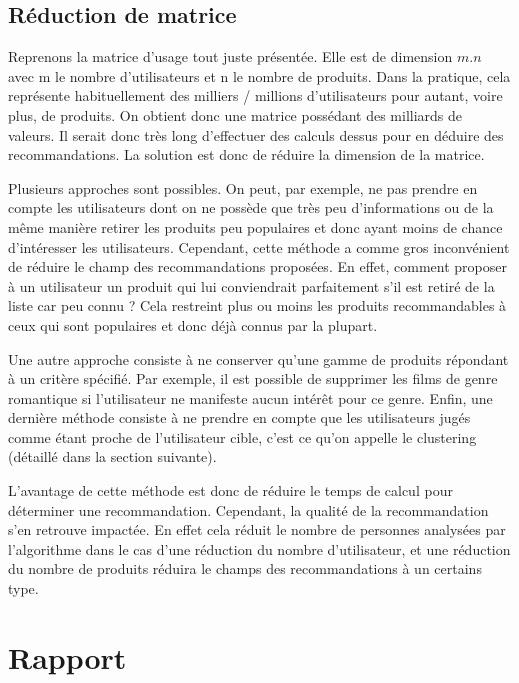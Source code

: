 \documentclass[11pt,a4paper]{report}
\begin{document}
\section{Réduction de matrice}

Reprenons la matrice d'usage tout juste présentée. Elle est de dimension $m.n$ avec m le nombre d'utilisateurs et n le nombre de produits. Dans la pratique, cela représente habituellement des milliers / millions d'utilisateurs pour autant, voire plus, de produits. On obtient donc une matrice possédant des milliards de valeurs. Il serait donc très long d'effectuer des calculs dessus pour en déduire des recommandations. La solution est donc de réduire la dimension de la matrice.
\vspace{0.5cm}

Plusieurs approches sont possibles. On peut, par exemple, ne pas prendre en compte les utilisateurs dont on ne possède que très peu d'informations ou de la même manière retirer les produits peu populaires et donc ayant moins de chance d'intéresser les utilisateurs. Cependant, cette méthode a comme gros inconvénient de réduire le champ des recommandations proposées. En effet, comment proposer à un utilisateur un produit qui lui conviendrait parfaitement s'il est retiré de la liste car peu connu ? Cela restreint plus ou moins les produits recommandables à ceux qui sont populaires et donc déjà connus par la plupart.\par
Une autre approche consiste à ne conserver qu'une gamme de produits répondant à un critère spécifié. Par exemple, il est possible de supprimer les films de genre romantique si l'utilisateur ne manifeste aucun intérêt pour ce genre. Enfin, une dernière méthode consiste à ne prendre en compte que les utilisateurs jugés comme étant proche de l'utilisateur cible, c'est ce qu'on appelle le clustering (détaillé dans la section suivante).\par
L'avantage de cette méthode est donc de réduire le temps de calcul pour déterminer une recommandation. Cependant, la qualité de la recommandation s'en retrouve impactée. En effet cela réduit le nombre de personnes analysées par l’algorithme dans le cas d’une réduction du nombre d’utilisateur, et une réduction du nombre de produits réduira le champs des recommandations à un certains type.






\chapter{Rapport}
\end{document}
